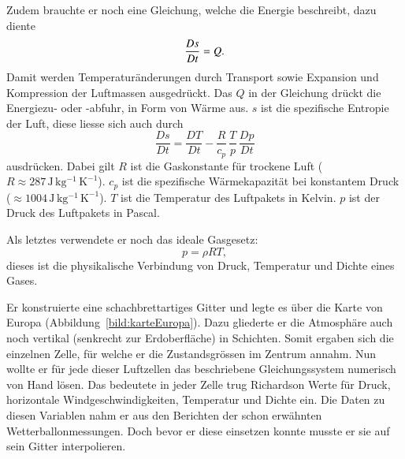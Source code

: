 Zudem brauchte er noch eine Gleichung, welche die Energie beschreibt, dazu diente 
\begin{equation}
	\frac{Ds}{Dt} = Q \\.
	\label{eq:enrgy}
\end{equation}
Damit werden Temperaturänderungen durch Transport sowie Expansion und Kompression der Luftmassen ausgedrückt.
%
%
%
Das ${Q}$ in der Gleichung drückt die Energiezu- oder -abfuhr, in Form von Wärme aus.
%
$s$ ist die spezifische Entropie der Luft, diese liesse sich auch durch 
%
\begin{equation}
	\frac{Ds}{Dt} = \frac{DT}{Dt} - \frac{R}{c_p} \, \frac{T}{p} \, \frac{Dp}{Dt}
	\label{eq:enrgy2}
\end{equation}
ausdrücken.
Dabei gilt $R$ ist die Gaskonstante für trockene Luft ($R \approx 287\,\mathrm{J\,kg^{-1}\,K^{-1}}$).
%
$c_p$ ist die spezifische Wärmekapazität bei konstantem Druck ($\approx 1004\,\mathrm{J\,kg^{-1}\,K^{-1}}$).
%
$T$ ist die Temperatur des Luftpakets in Kelvin.
%
$p$ ist der Druck des Luftpakets in Pascal.

Als letztes verwendete er noch das ideale Gasgesetz:
%
%
\begin{equation}
	p = \rho R T,
	\label{eq:gasgesetz}
\end{equation}
dieses ist die physikalische Verbindung von Druck, Temperatur und Dichte eines Gases.  

Er konstruierte eine schachbrettartiges Gitter und legte es über die Karte von Europa (Abbildung~\ref{bild:karteEuropa}).
Dazu gliederte er die Atmosphäre auch noch vertikal (senkrecht zur Erdoberfläche) in Schichten.
Somit ergaben sich die einzelnen Zelle, für welche er die Zustandsgrössen im Zentrum annahm. 
Nun wollte er für jede dieser Luftzellen das beschriebene Gleichungssystem numerisch von Hand lösen.
Das bedeutete in jeder Zelle trug Richardson Werte für Druck, horizontale Windgeschwindigkeiten, Temperatur und Dichte ein.
Die Daten zu diesen Variablen nahm er aus den Berichten der schon erwähnten Wetterballonmessungen.
Doch bevor er diese einsetzen konnte musste er sie auf sein Gitter interpolieren. 


